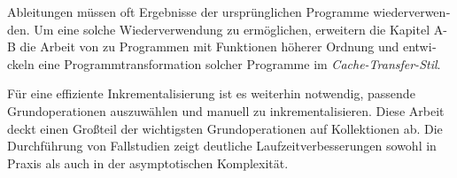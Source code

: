 \begin{otherlanguage}{ngerman}
Ableitungen müssen oft Ergebnisse der ursprünglichen Programme wiederverwenden. Um
eine solche Wiederverwendung zu ermöglichen, erweitern die Kapitel A-B die
Arbeit von \citet{Liu95} zu Programmen mit Funktionen höherer Ordnung und
entwickeln eine Programmtransformation solcher Programme im \emph{Cache-Transfer-Stil}.

Für eine effiziente Inkrementalisierung ist es weiterhin notwendig, passende
Grundoperationen auszuwählen und manuell zu inkrementalisieren. Diese
Arbeit deckt einen Großteil der wichtigsten Grundoperationen auf
Kollektionen ab. Die Durchführung von Fallstudien zeigt deutliche
Laufzeitverbesserungen sowohl in Praxis als auch in der asymptotischen
Komplexität.

\end{otherlanguage}


